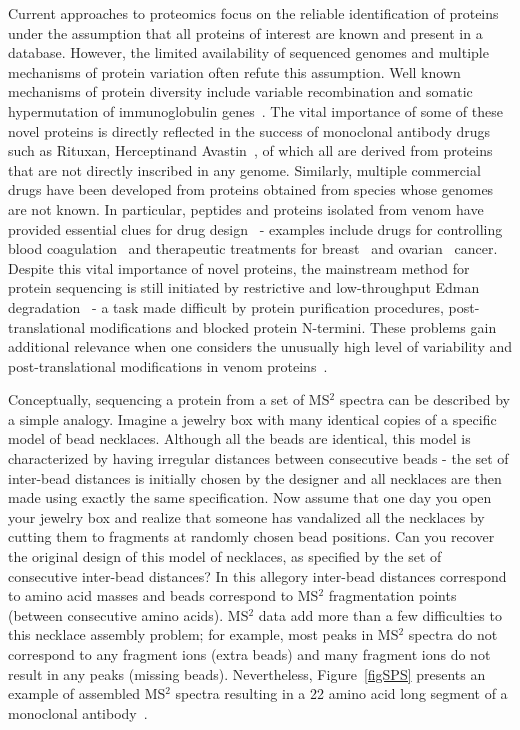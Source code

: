 \documentclass[8.5pt,twoside,twocolumn]{article}
\begin{document}
Current approaches to proteomics focus on the reliable identification of proteins under the assumption that all proteins of interest are known and present in a database. However, the limited availability of sequenced genomes and multiple mechanisms of protein
variation often refute this assumption. Well known mechanisms of protein diversity include variable recombination and somatic hypermutation of immunoglobulin genes~\cite{gearhart02}. The vital importance of some of these novel proteins is directly reflected in the success of monoclonal antibody drugs such as Rituxan\texttrademark, Herceptin\texttrademark and Avastin\texttrademark~\cite{wiles06,haurum06,bandeira08}, of which all are derived from proteins that are not directly inscribed in any genome. Similarly, multiple commercial drugs have been developed from proteins obtained from species whose genomes are not known. In particular, peptides and proteins isolated from venom have provided essential clues for drug design~\cite{lewis03,pimenta05} - examples include drugs for controlling blood coagulation~\cite{joseph04,swenson04a,kini01} and therapeutic treatments for breast~\cite{swenson04,pal02} and ovarian~\cite{markland01} cancer. Despite this vital importance of novel proteins, the mainstream method for protein sequencing is still initiated by restrictive and low-throughput Edman degradation~\cite{ZugastiCruz06,ogawa04} - a task made difficult by protein purification procedures, post-translational modifications and blocked protein N-termini. These problems gain additional relevance when one considers the unusually high level of variability and post-translational modifications in venom proteins~\cite{buczek05,pimenta05a}.

Conceptually, sequencing a protein from a set of MS$^2$ spectra can be described by a simple analogy. Imagine a jewelry box with many identical copies of a specific model of bead necklaces. Although all the beads are identical, this model is characterized by having
irregular distances between consecutive beads \-- the set of inter-bead distances is initially chosen by the designer and all
necklaces are then made using exactly the same specification. Now assume that one day you open your jewelry  box and realize that
someone has vandalized all the necklaces by cutting them to fragments at randomly chosen bead positions. Can you recover the
original design of this model of necklaces, as specified by the set of consecutive inter-bead distances? In this allegory inter-bead distances correspond to amino acid masses and beads correspond to MS$^2$ fragmentation points (between consecutive amino acids). MS$^2$ data add more than a few difficulties to this necklace assembly problem; for example, most peaks in MS$^2$ spectra do not correspond to any fragment ions (extra beads) and many fragment ions do not result in any peaks (missing beads). Nevertheless, Figure~\ref{figSPS} presents an example of assembled MS$^2$ spectra resulting in a 22 amino acid long segment of a monoclonal antibody~\cite{bandeira08natbio}.
\end{document}
